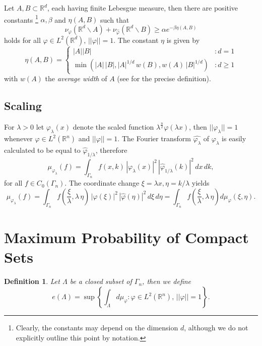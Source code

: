 \documentclass[12pt,a4paper]{article}
\newcommand{\RR}[1]{\mathbb{R}^#1}
\newtheorem{definition}{Definition}
\begin{document}
Let $A,B\subset {\RR d}$, each having finite Lebesgue measure, then there are
positive constants \footnote{Clearly, the constants may depend on the dimension 
$d$, although we do not explicitly outline this point by notation.}
$\alpha,\beta$ and $\eta(A,B)$ such that
\begin{equation}\label{JamingNazarov}
     \nu_{\varphi}({\RR d}\backslash A)+
       \nu_{\hat\varphi}({\RR d}\backslash B) \geq \alpha e^{-\beta \eta(A,B)}
\end{equation}
holds  for all $\varphi\in L^2(\RR d),\,||\varphi||=1$. The constant $\eta$
is given by
\begin{displaymath}
    \eta(A,B) = \left\{ \begin{array}{lr} |A| |B| & : d = 1
     \\ \min(|A|\,|B|,|A|^{1/d}\, w(B), w(A)\, |B|^{1/d}) & : d \ge 1 
     \end{array} \right.
\end{displaymath}
with $w(A)$ the {\sl average width} of $A$ (see \cite{jaming:hal-00120268} 
for the precise definition).

\subsection{Scaling}
For $\lambda>0$ let $\varphi_{\lambda}(x)$ denote the scaled function 
$\lambda^\frac{n}{2} \varphi(\lambda x)$, then $||\varphi_{\lambda}||=1$ whenever 
$\varphi\in L^2(\RR n)$ and $||\varphi||=1$. The Fourier transform 
$\widehat{\varphi_{\lambda}}$ of $\varphi_{\lambda}$ is easily calculated
to be equal to $\hat{\varphi}_{1/\lambda}$, therefore 
\begin{equation}
    \mu_{\varphi_{\lambda}}(f) = \int_{\Gamma_n} f(x,k) 
       \,|\varphi_{\lambda}(x)|^2 \, |\hat{\varphi}_{1/\lambda}(k)|^2 \,
       dx\,dk,
\end{equation}
for all $f\in C_0(\Gamma_n)$. The coordinate change $\xi=\lambda x, 
\eta=k/\lambda$ yields
\begin{equation}
    \mu_{\varphi_{\lambda}}(f) = \int_{\Gamma_n} f(\frac{\xi}{\lambda},
      \lambda\,\eta) 
       \,|\varphi(\xi)|^2 \, |\hat{\varphi}(\eta)|^2 \,
       d\xi\,d\eta = \int_{\Gamma_n}  f(\frac{\xi}{\lambda},
      \lambda\,\eta) d\mu_{\varphi}(\xi,\eta).
\end{equation}


\section{Maximum Probability of Compact Sets}
\begin{definition}
Let $\Lambda$ be a closed subset of $\Gamma_n$, then we define
\begin{equation}
     e(\Lambda) = \sup \left\{ \int_{\Lambda} d\mu_{\varphi} : 
                     \varphi\in L^2(\RR n), \, ||\varphi|| = 1 \right\}.
\end{equation}
\end{definition}
\end{document}
